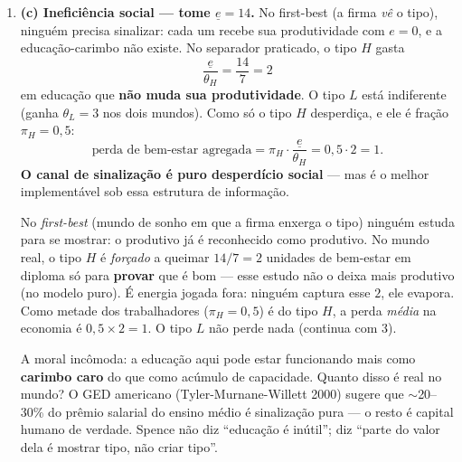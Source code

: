 \documentclass[11pt,a4paper]{article}
\newcommand{\dc}[2]{#1{,}#2}
\begin{document}
\begin{enumerate}[leftmargin=2em,itemsep=4pt]
\item \textbf{(c) Ineficiência social — tome $\underline e=14$.} No first-best (a firma
\emph{vê} o tipo), ninguém precisa sinalizar: cada um recebe sua produtividade com $e=0$, e a
educação-carimbo não existe. No separador praticado, o tipo $H$ gasta
\[
\frac{\underline e}{\theta_H}=\frac{14}{7}=2 \tag{1.5}
\]
em educação que \textbf{não muda sua produtividade}. O tipo $L$ está indiferente (ganha
$\theta_L=3$ nos dois mundos). Como só o tipo $H$ desperdiça, e ele é fração $\pi_H=\dc{0}{5}$:
\[
\boxed{\;\text{perda de bem-estar agregada} = \pi_H\cdot\frac{\underline e}{\theta_H}
= \dc{0}{5}\cdot 2 = 1.\;} \tag{1.6}
\]
\textbf{O canal de sinalização é puro desperdício social} — mas é o melhor implementável sob
essa estrutura de informação.

\begin{empalavras}[Por que ``desperdício'' e o que significa a perda $=1$]
No \emph{first-best} (mundo de sonho em que a firma enxerga o tipo) ninguém estuda para se
mostrar: o produtivo já é reconhecido como produtivo. No mundo real, o tipo $H$ é \emph{forçado}
a queimar $14/7=2$ unidades de bem-estar em diploma só para \textbf{provar} que é bom — esse
estudo não o deixa mais produtivo (no modelo puro). É energia jogada fora: ninguém captura
esse $2$, ele evapora. Como metade dos trabalhadores ($\pi_H=\dc{0}{5}$) é do tipo $H$, a perda
\emph{média} na economia é $\dc{0}{5}\times 2=1$. O tipo $L$ não perde nada (continua com $3$).

\smallskip\noindent
A moral incômoda: a educação aqui pode estar funcionando mais como \textbf{carimbo caro} do que
como acúmulo de capacidade. Quanto disso é real no mundo? O GED americano
(Tyler-Murnane-Willett 2000) sugere que $\sim$20--30\% do prêmio salarial do ensino médio é
sinalização pura — o resto é capital humano de verdade. Spence não diz ``educação é inútil''; diz
``parte do valor dela é mostrar tipo, não criar tipo''.
\end{empalavras}

\end{enumerate}
\end{document}
